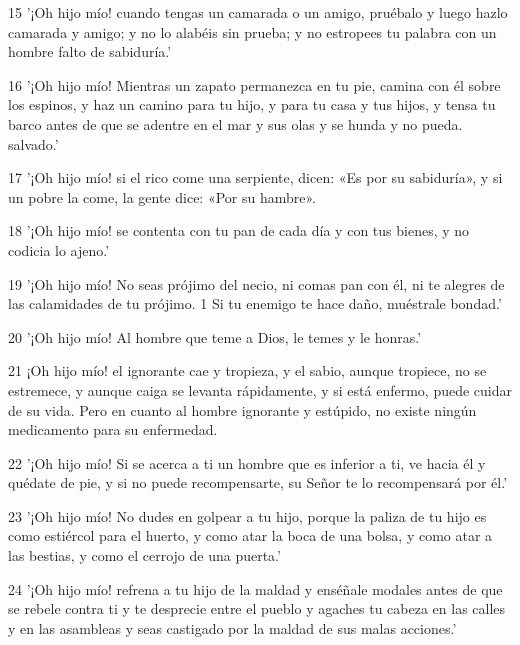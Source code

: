 \par 15 '¡Oh hijo mío! cuando tengas un camarada o un amigo, pruébalo y luego hazlo camarada y amigo; y no lo alabéis sin prueba; y no estropees tu palabra con un hombre falto de sabiduría.'

\par 16 '¡Oh hijo mío! Mientras un zapato permanezca en tu pie, camina con él sobre los espinos, y haz un camino para tu hijo, y para tu casa y tus hijos, y tensa tu barco antes de que se adentre en el mar y sus olas y se hunda y no pueda. salvado.'

\par 17 '¡Oh hijo mío! si el rico come una serpiente, dicen: «Es por su sabiduría», y si un pobre la come, la gente dice: «Por su hambre».

\par 18 '¡Oh hijo mío! se contenta con tu pan de cada día y con tus bienes, y no codicia lo ajeno.'

\par 19 '¡Oh hijo mío! No seas prójimo del necio, ni comas pan con él, ni te alegres de las calamidades de tu prójimo. 1 Si tu enemigo te hace daño, muéstrale bondad.'

\par 20 '¡Oh hijo mío! Al hombre que teme a Dios, le temes y le honras.'

\par 21 ¡Oh hijo mío! el ignorante cae y tropieza, y el sabio, aunque tropiece, no se estremece, y aunque caiga se levanta rápidamente, y si está enfermo, puede cuidar de su vida. Pero en cuanto al hombre ignorante y estúpido, no existe ningún medicamento para su enfermedad.

\par 22 '¡Oh hijo mío! Si se acerca a ti un hombre que es inferior a ti, ve hacia él y quédate de pie, y si no puede recompensarte, su Señor te lo recompensará por él.'

\par 23 '¡Oh hijo mío! No dudes en golpear a tu hijo, porque la paliza de tu hijo es como estiércol para el huerto, y como atar la boca de una bolsa, y como atar a las bestias, y como el cerrojo de una puerta.'

\par 24 '¡Oh hijo mío! refrena a tu hijo de la maldad y enséñale modales antes de que se rebele contra ti y te desprecie entre el pueblo y agaches tu cabeza en las calles y en las asambleas y seas castigado por la maldad de sus malas acciones.'

